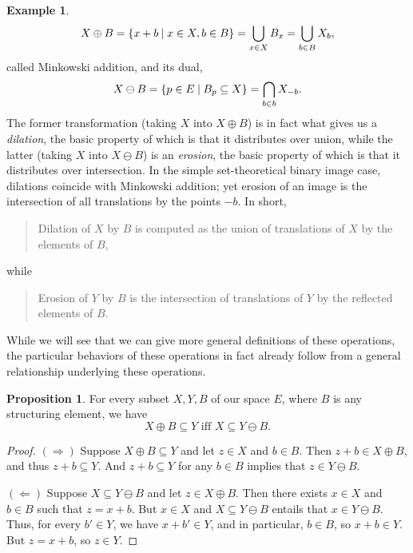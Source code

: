 \documentclass[a4paper]{book}
\theoremstyle{definition}
\newtheorem{example}{Example}[section]
\theoremstyle{definition}
\theoremstyle{definition}
\newtheorem{proposition}{Proposition}[section]
\theoremstyle{theorem}
\theoremstyle{definition}
\begin{document}
\begin{example}
\begin{equation}
	X \oplus B = \{x + b \hspace*{0.25em}| \hspace*{0.25em} x \in X, b \in B \} = \bigcup_{x \in X} B_x = \bigcup_{b \in B} X_b,
	\end{equation}
	called Minkowski addition, and its dual, 
	\begin{equation}
	X \ominus B = \{p \in E \hspace*{0.25em}| \hspace*{0.25em} B_p \subseteq  X \} = \bigcap_{b \in b} X_{-b}.
	\end{equation}
	The former transformation (taking $X$ into $X \oplus B$) is in fact what gives us a \textit{dilation},  the basic property of which is that it distributes over union, while the latter (taking $X$ into $X \ominus B$) is an \textit{erosion},  the basic property of which is that it distributes over intersection. In the simple set-theoretical binary image case, dilations coincide with Minkowski addition; yet erosion of an image is the intersection of all translations by the points $-b$. In short,  
	\begin{quote}
		Dilation of $X$ by $B$ is computed as the union of translations of $X$ by the elements of $B$, 
	\end{quote}
while 
\begin{quote}
	Erosion of $Y$ by $B$ is the intersection of translations of $Y$ by the reflected elements of $B$.
\end{quote} \noindent 
While we will see that we can give more general definitions of these operations, the particular behaviors of these operations in fact already follow from a general relationship underlying these operations.
\begin{proposition} 
	For every subset $X, Y, B$ of our space $E$, where $B$ is any structuring element, we have  
	\begin{equation}
	X \oplus B \subseteq  Y \text{ iff } X \subseteq  Y \ominus B. 
	\end{equation}
\end{proposition}
	\begin{proof}
		$(\Rightarrow)$ Suppose $X \oplus B \subseteq  Y$ and let $z \in X$ and $b \in B$. Then $z + b \in X \oplus B$, and thus $z + b \subseteq  Y$. And $z + b \subseteq  Y$ for any $b \in B$ implies that $z \in Y \ominus B$. \par \noindent  
		$(\Leftarrow)$ Suppose $X \subseteq  Y \ominus B$ and let $z \in X \oplus B$. Then there exists $x \in X$ and $b \in B$ such that $z = x + b$. But $x \in X$ and $X \subseteq  Y \ominus B$ entails that $x \in Y \ominus B$. Thus, for every $b' \in Y$, we have $x + b' \in Y$, and in particular, $b \in B$, so $x + b \in Y$. But $z = x + b$, so $z \in Y$. 

\end{proof}
\end{example}
\end{document}
